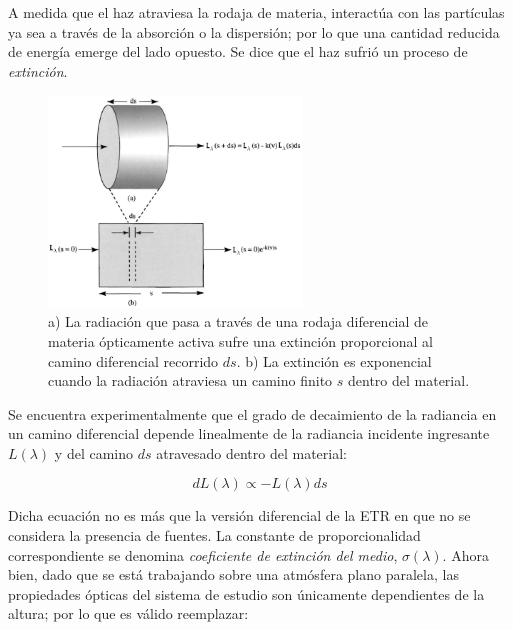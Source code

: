         A medida que el haz atraviesa la rodaja de materia, interactúa con las partículas ya sea a través de la absorción o la dispersión; por lo que una cantidad reducida de energía emerge del lado opuesto. Se dice que el haz sufrió un proceso de \textit{extinción}.
    
        \begin{figure}
        \centering
        \includegraphics[width=0.6\textwidth]{sos/figures/extincion.png}
        \caption[Esquemas de extinción de la luz (Ley de Bouguer-Lambert-Beer).]{a) La radiación que pasa a través de una rodaja diferencial de materia ópticamente activa sufre una extinción proporcional al camino diferencial recorrido $ds$. b) La extinción es exponencial cuando la radiación atraviesa un camino finito $s$ dentro del material.}
        \label{sos:extincion}
        \end{figure}
        
        Se encuentra experimentalmente que el grado de decaimiento de la radiancia en un camino diferencial depende linealmente de la radiancia incidente ingresante $L(\lambda)$ y del camino $ds$ atravesado dentro del material:
        
        \begin{equation}
        dL(\lambda)\propto -L(\lambda) ds
        \label{sos:eq:laambertdif2}
        \end{equation}
        
        Dicha ecuación no es más que la versión diferencial de la ETR en que no se considera la presencia de fuentes. La constante de proporcionalidad correspondiente se denomina \textit{coeficiente de extinción del medio}, $\sigma(\lambda)$. Ahora bien, dado que se está trabajando sobre una atmósfera plano paralela, las propiedades ópticas del sistema de estudio son únicamente dependientes de la altura; por lo que es válido reemplazar:
        

